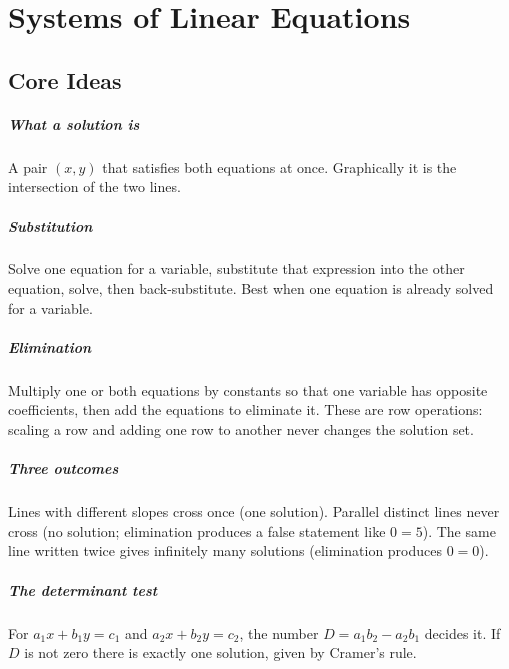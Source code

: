 \chapter{Systems of Linear Equations}


\section{Core Ideas}

\paragraph{What a solution is} A pair $(x, y)$ that satisfies both equations at once. Graphically it is the intersection of the two lines.

\paragraph{Substitution} Solve one equation for a variable, substitute that expression into the other equation, solve, then back-substitute. Best when one equation is already solved for a variable.

\paragraph{Elimination} Multiply one or both equations by constants so that one variable has opposite coefficients, then add the equations to eliminate it. These are row operations: scaling a row and adding one row to another never changes the solution set.

\paragraph{Three outcomes} Lines with different slopes cross once (one solution). Parallel distinct lines never cross (no solution; elimination produces a false statement like $0 = 5$). The same line written twice gives infinitely many solutions (elimination produces $0 = 0$).

\paragraph{The determinant test} For $a_1 x + b_1 y = c_1$ and $a_2 x + b_2 y = c_2$, the number $D = a_1 b_2 - a_2 b_1$ decides it. If $D$ is not zero there is exactly one solution, given by Cramer's rule.


